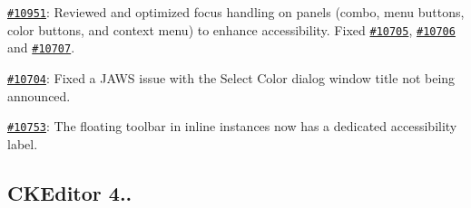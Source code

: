 \begin{DoxyItemize}
\item \href{http://dev.ckeditor.com/ticket/10951}{\tt \#10951}\-: Reviewed and optimized focus handling on panels (combo, menu buttons, color buttons, and context menu) to enhance accessibility. Fixed \href{http://dev.ckeditor.com/ticket/10705}{\tt \#10705}, \href{http://dev.ckeditor.com/ticket/10706}{\tt \#10706} and \href{http://dev.ckeditor.com/ticket/10707}{\tt \#10707}.
\item \href{http://dev.ckeditor.com/ticket/10704}{\tt \#10704}\-: Fixed a J\-A\-W\-S issue with the Select Color dialog window title not being announced.
\item \href{http://dev.ckeditor.com/ticket/10753}{\tt \#10753}\-: The floating toolbar in inline instances now has a dedicated accessibility label.
\end{DoxyItemize}

\subsection*{C\-K\-Editor 4..}

